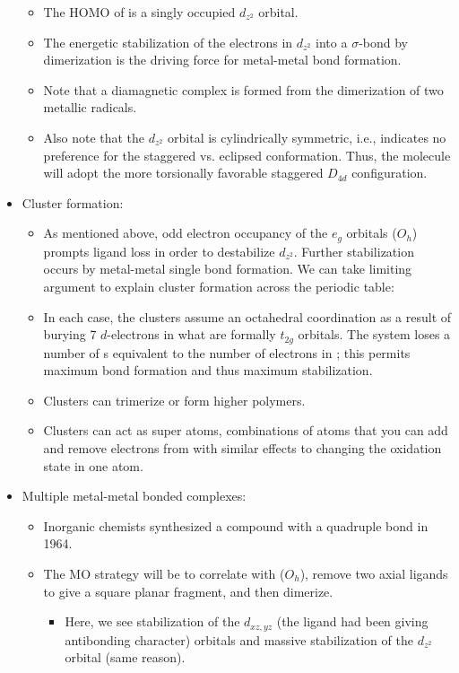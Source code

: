 \documentclass[../notes.tex]{subfiles}
\begin{document}
\begin{itemize}
\begin{itemize}
        \item The HOMO of  is a singly occupied $d_{z^2}$ orbital.
        \item The energetic stabilization of the electrons in $d_{z^2}$ into a $\sigma$-bond by dimerization is the driving force for metal-metal bond formation.
        \item Note that a diamagnetic complex is formed from the dimerization of two metallic radicals.
        \item Also note that the $d_{z^2}$ orbital is cylindrically symmetric, i.e., indicates no preference for the staggered vs. eclipsed conformation. Thus, the molecule will adopt the more torsionally favorable staggered $D_{4d}$ configuration.
    \end{itemize}
    \item Cluster formation:
    \begin{itemize}
        \item As mentioned above, odd electron occupancy of the $e_g$ orbitals ($O_h$) prompts ligand loss in order to destabilize $d_{z^2}$. Further stabilization occurs by metal-metal single bond formation. We can take limiting argument to explain cluster formation across the periodic table:
        \item In each case, the clusters assume an octahedral coordination as a result of burying 7 $d$-electrons in what are formally $t_{2g}$ orbitals. The system loses a number of s equivalent to the number of electrons in ; this permits maximum  bond formation and thus maximum stabilization.
        \item Clusters can trimerize or form higher polymers.
        \item Clusters can act as super atoms, combinations of atoms that you can add and remove electrons from with similar effects to changing the oxidation state in one atom.
    \end{itemize}
    \item Multiple metal-metal bonded complexes:
    \begin{itemize}
        \item Inorganic chemists synthesized a compound with a quadruple bond in 1964.
        \item The MO strategy will be to correlate  with  ($O_h$), remove two axial  ligands to give a square planar  fragment, and then dimerize.
        \begin{itemize}
            \item Here, we see stabilization of the $d_{xz,yz}$ (the  ligand had been giving antibonding character) orbitals and massive stabilization of the $d_{z^2}$ orbital (same reason).

\end{itemize}
\end{itemize}
\end{itemize}
\end{document}
